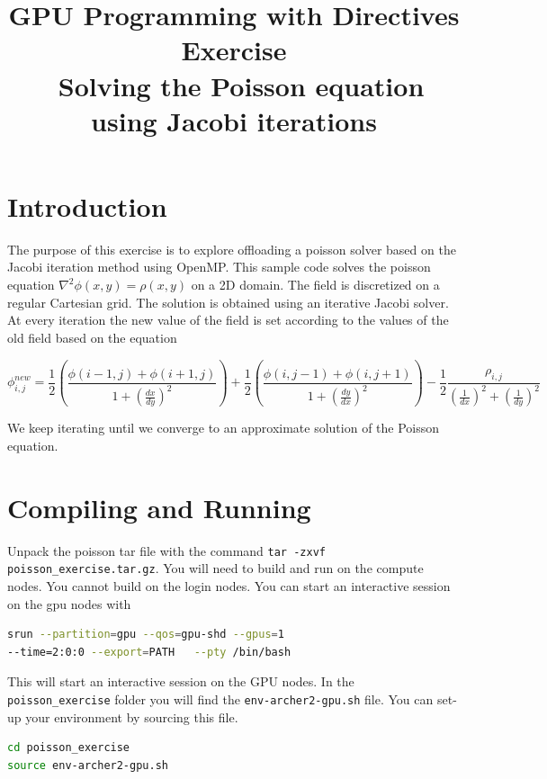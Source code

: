 \documentclass{article}
\title{GPU Programming with Directives Exercise \\\ Solving the Poisson equation using Jacobi iterations}
\author{}
\date{}
\begin{document}
\maketitle

\section{Introduction}

The purpose of this exercise is to explore offloading a poisson solver based on the Jacobi iteration method using OpenMP. 
This sample code solves the poisson equation $\nabla^2 \phi(x,y) = \rho(x,y)$ on a 2D domain. 
The field is discretized on a regular Cartesian grid.
The solution is obtained using an iterative Jacobi solver. At every iteration the new value of the field is set according to the values of the old field based on the equation

\begin{equation}
    \phi^{new}_{i,j}= \frac{1}{2} \left( \frac{\phi( i-1,j) + \phi(i+1,j)}{1+\left(\frac{dx}{dy}\right)^2}\right)  + \frac{1}{2} \left( \frac{\phi( i ,j-1) + \phi(i,j+1)}{1+\left(\frac{dy}{dx}\right)^2}\right) -  \frac{1}{2}\frac{\rho_{i,j}}{\left(\frac{1}{dx}\right)^2 + \left(\frac{1}{dy}\right)^2 }
\end{equation}

We keep iterating until we converge to an approximate solution of the Poisson equation.

\section{Compiling and Running}
Unpack the poisson tar file with the command \texttt{tar -zxvf poisson\_exercise.tar.gz}.
You will need to build and run on the compute nodes. You cannot build on the login nodes.
You can start an interactive session on the gpu nodes with

\begin{lstlisting}[language=Bash]
srun --partition=gpu --qos=gpu-shd --gpus=1
--time=2:0:0 --export=PATH   --pty /bin/bash
\end{lstlisting}
This will start an interactive session on the GPU nodes.
In the \texttt{poisson\_exercise} folder you will find the \texttt{env-archer2-gpu.sh} file. You can set-up your environment by sourcing this file.

\begin{lstlisting}[language=Bash]
cd poisson_exercise
source env-archer2-gpu.sh
\end{lstlisting}
\end{document}
